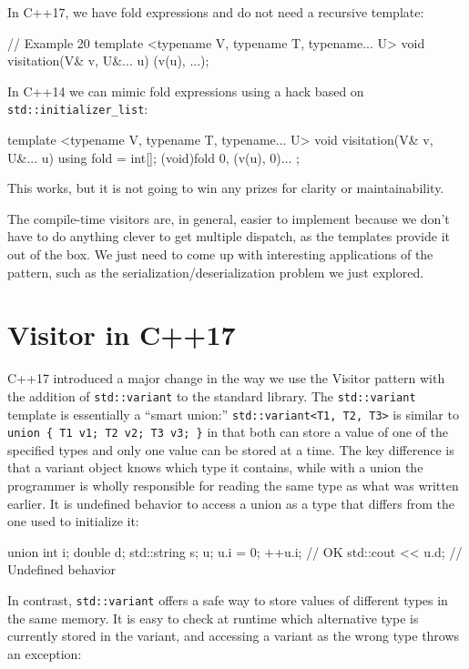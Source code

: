 In C++17, we have fold expressions and do not need a recursive template:

\begin{code}
// Example 20
template <typename V, typename T, typename... U>
void visitation(V& v, U&... u) {
  (v(u), ...);
}
\end{code}

In C++14 we can mimic fold expressions using a hack based on \texttt{std::initializer\_list}:

\begin{code}
template <typename V, typename T, typename... U>
void visitation(V& v, U&... u) {
  using fold = int[];
  (void)fold { 0, (v(u), 0)... };
}
\end{code}

This works, but it is not going to win any prizes for clarity or maintainability.

The compile-time visitors are, in general, easier to implement because we don't have to do anything clever to get multiple dispatch, as the templates provide it out of the box. We just need to come up with interesting applications of the pattern, such as the serialization/deserialization problem we just explored.

\section{Visitor in C++17}

C++17 introduced a major change in the way we use the Visitor pattern with the addition of \texttt{std::variant} to the standard library. The \texttt{std::variant} template is essentially a ``smart union:'' \texttt{std::variant\textless{}T1,\ T2,\ T3\textgreater{}} is similar to \texttt{union\ \{\ T1\ v1;\ T2\ v2;\ T3\ v3;\ \}} in that both can store a value of one of the specified types and only one value can be stored at a time. The key difference is that a variant object knows which type it contains, while with a union the programmer is wholly responsible for reading the same type as what was written earlier. It is undefined behavior to access a union as a type that differs from the one used to initialize it:

\begin{code}
union { int i; double d; std::string s; } u;
u.i = 0;
++u.i;               // OK
std::cout << u.d;     // Undefined behavior
\end{code}

In contrast, \texttt{std::variant} offers a safe way to store values of different types in the same memory. It is easy to check at runtime which alternative type is currently stored in the variant, and accessing a variant as the wrong type throws an exception:

